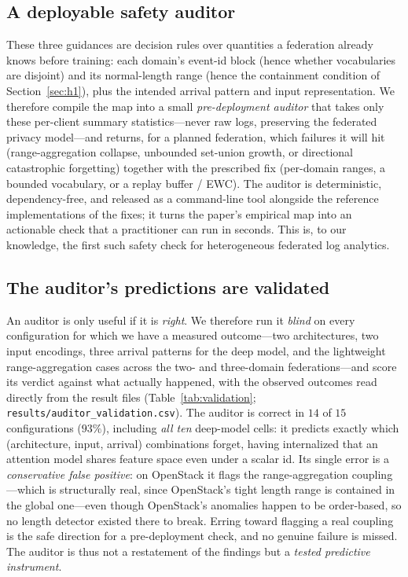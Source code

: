 \documentclass[journal]{IEEEtran}
\begin{document}
\subsection{A deployable safety auditor}\label{sec:auditor}
These three guidances are decision rules over quantities a
federation already knows before training: each domain's event-id block (hence whether vocabularies
are disjoint) and its normal-length range (hence the containment condition of Section~\ref{sec:h1}),
plus the intended arrival pattern and input representation. We therefore compile the map into a small
\emph{pre-deployment auditor} that takes only these per-client summary statistics---never raw
logs, preserving the federated privacy model---and returns, for a planned federation, which failures
it will hit (range-aggregation collapse, unbounded set-union growth, or directional catastrophic
forgetting) together with the prescribed fix (per-domain ranges, a bounded vocabulary, or a replay
buffer / EWC). The auditor is deterministic, dependency-free, and released as a command-line tool
alongside the reference implementations of the fixes; it turns the paper's empirical map into an
actionable check that a practitioner can run in seconds. This is, to our knowledge, the first such
safety check for heterogeneous federated log analytics.

\subsection{The auditor's predictions are validated}\label{sec:validation}
An auditor is only useful if it is \emph{right}. We therefore run it \emph{blind} on every
configuration for which we have a measured outcome---two architectures, two input encodings, three
arrival patterns for the deep model, and the lightweight range-aggregation cases across the two- and
three-domain federations---and score its verdict against what actually happened, with the observed
outcomes read directly from the result files (Table~\ref{tab:validation};
\texttt{results/auditor\_validation.csv}). The auditor is correct in $14$ of $15$ configurations
($93\%$), including \emph{all ten} deep-model cells: it predicts exactly which (architecture, input,
arrival) combinations forget, having internalized that an attention model shares feature space even
under a scalar id. Its single error is a \emph{conservative false positive}: on OpenStack it flags the
range-aggregation coupling---which is structurally real, since OpenStack's tight length range is
contained in the global one---even though OpenStack's anomalies happen to be order-based, so no length
detector existed there to break. Erring toward flagging a real coupling is the safe direction for a
pre-deployment check, and no genuine failure is missed. The auditor is thus not a restatement of the
findings but a \emph{tested predictive instrument}.
\end{document}
